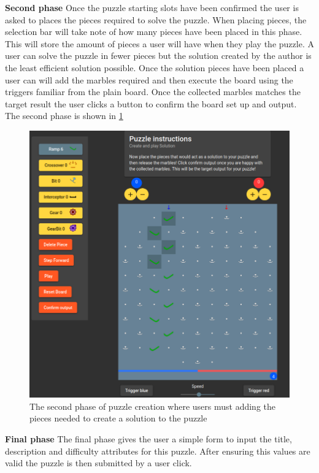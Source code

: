 \documentclass{l4proj}
\begin{document}
\textbf{Second phase}
Once the puzzle starting slots have been confirmed the user is asked to places the pieces required to solve the puzzle. When placing pieces, the selection bar will take note of how many pieces have been placed in this phase. This will store the amount of pieces a user will have when they play the puzzle. A user can solve the puzzle in fewer pieces but the solution created by the author is the least efficient solution possible. Once the solution pieces have been placed a user can will add the marbles required and then execute the board using the triggers familiar from the plain board. Once the collected marbles matches the target result the user clicks a button to confirm the board set up and output. The second phase is shown in \ref{fig:puzzleCreation}


\begin{figure}
    \centering
    \includegraphics[width=0.7\linewidth]{images/puzzleCreation.png}
    \caption{The second phase of puzzle creation where users must adding the pieces needed to create a solution to the puzzle}
    \label{fig:puzzleCreation}
\end{figure}

\textbf{Final phase}
The final phase gives the user a simple form to input the title, description and difficulty attributes for this puzzle. After ensuring this values are valid the puzzle is then submitted by a user click.
\end{document}
